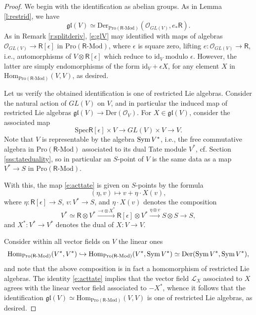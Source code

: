 \documentclass{amsart}
\theoremstyle{definition}
\newcommand{\Pro}{\on{Pro}}
\newcommand{\OO}{\mathscr{O}}
\newcommand{\Hom}{\on{Hom}}
\renewcommand{\mod}{\text{-}\on{Mod}}
\newcommand{\Sym}{\on{Sym}\hspace{.5mm}}
\newcommand{\on}{\mathrm}
\newcommand{\Ring}{\mathsf{R}}
\numberwithin{equation}{section}
\begin{document}
\begin{proof} We begin with the identification as abelian groups. As in Lemma \ref{l:restrid}, we have 
\begin{equation} \label{e:glV}\mathfrak{gl}(V) \simeq \on{Der}_{\on{Pro}(\Ring\mod)}(\OO_{GL(V)}, e_* \Ring).\end{equation}
As in Remark \ref{r:splitderiv}, \eqref{e:glV} may identified with maps of algebras $\OO_{GL(V)} \rightarrow \Ring[\epsilon]$ in $\Pro(\Ring\mod)$, where $\epsilon$ is square zero, lifting $e: \OO_{GL(V)} \rightarrow \Ring$, i.e., automorphisms of $V \otimes \Ring[\epsilon]$ which reduce to $\on{id}_V$ modulo $\epsilon$. However, the latter are simply endomorphisms of the form $\on{id}_V + \epsilon X$, for any element $X$ in $\on{Hom}_{\Pro(\Ring\mod)}(V,V)$, as desired. 


Let us verify the obtained identification is one of restricted Lie algebras. Consider the natural action of $GL(V)$ on $V$, and in particular the induced map of restricted Lie algebras
$\mathfrak{gl}(V) \rightarrow \on{Der}(\OO_V).$ For $X \in \mathfrak{gl}(V)$, consider the associated map 
\begin{equation} \label{e:acttate}\on{Spec} \Ring[\epsilon] \times V \rightarrow GL(V) \times V \rightarrow V.\end{equation}
Note that $V$ is representable by the algebra $\Sym V^*$, i.e., the free commutative algebra in $\Pro(\Ring\mod)$ associated to its dual Tate module $V^*$, cf. Section \ref{sss:tateduality}, so in particular an $S$-point of $V$ is the same data as a map $V^* \rightarrow S$ in $\Pro(\Ring\mod)$.  


With this, the map \eqref{e:acttate} is given on $S$-points by the formula
$$(\eta, v) \mapsto v + \eta \cdot X(v),$$where $\eta: \Ring[\epsilon] \rightarrow S$, $v: V^* \rightarrow S$, and $\eta \cdot X(v)$ denotes the composition
$$V^* \simeq \Ring \otimes V^* \xrightarrow{-\epsilon \otimes X^*} \Ring[\epsilon] \otimes V^* \xrightarrow{\eta \otimes v} S \otimes S \rightarrow S,$$and $X^*: V^* \rightarrow V^*$ denotes the dual of $X: V \rightarrow V$. 

Consider within all vector fields on $V$ the linear ones
$$\Hom_{\Pro(\Ring\mod)}(V^*, V^*) \hookrightarrow \Hom_{\Pro(\Ring\mod)}(V^*, \Sym V^*) \simeq \on{Der}(\Sym V^*, \Sym V^*),$$and note that the above composition is in fact a homomorphism of restricted Lie algebras. The identity \eqref{e:acttate} implies that the vector field $\mathscr{L}_X$ associated to $X$ agrees with the linear vector field associated to $-X^*$, whence it follows that the identification $\mathfrak{gl}(V) \simeq \on{Hom}_{\Pro(\Ring\mod)}(V,V)$ is one of restricted Lie algebras, as desired. 
\end{proof}
\end{document}
